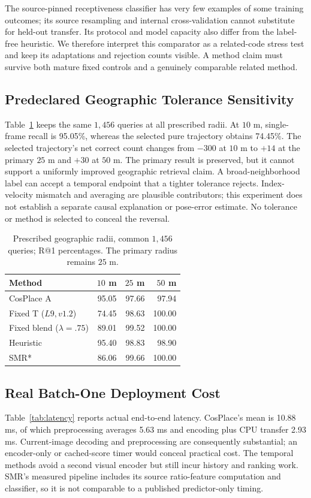 \documentclass[conference]{IEEEtran}
\begin{document}
The source-pinned receptiveness classifier has very few examples of some training outcomes; its source resampling and internal cross-validation cannot substitute for held-out transfer. Its protocol and model capacity also differ from the label-free heuristic. We therefore interpret this comparator as a related-code stress test and keep its adaptations and rejection counts visible. A method claim must survive both mature fixed controls and a genuinely comparable related method.

\subsection{Predeclared Geographic Tolerance Sensitivity}
Table~\ref{tab:radius} keeps the same $1,456$ queries at all prescribed radii. At $10$ m, single-frame recall is 95.05\%, whereas the selected pure trajectory obtains 74.45\%. The selected trajectory's net correct count changes from $-300$ at $10$ m to $+14$ at the primary $25$ m and $+30$ at $50$ m. The primary result is preserved, but it cannot support a uniformly improved geographic retrieval claim. A broad-neighborhood label can accept a temporal endpoint that a tighter tolerance rejects. Index-velocity mismatch and averaging are plausible contributors; this experiment does not establish a separate causal explanation or pose-error estimate. No tolerance or method is selected to conceal the reversal.
\begin{table}[t]\centering\small
\caption{Prescribed geographic radii, common $1,456$ queries; R@1 percentages. The primary radius remains $25$ m.}\label{tab:radius}
\begin{tabular}{lrrr}\toprule Method & $10$ m & $25$ m & $50$ m\\\midrule
CosPlace A & 95.05 & 97.66 & 97.94\\
Fixed T ($L9,v1.2$) & 74.45 & 98.63 & 100.00\\
Fixed blend ($\lambda=.75$) & 89.01 & 99.52 & 100.00\\
Heuristic & 95.40 & 98.83 & 98.90\\
SMR* & 86.06 & 99.66 & 100.00\\
\bottomrule\end{tabular}\end{table}

\subsection{Real Batch-One Deployment Cost}
Table~\ref{tab:latency} reports actual end-to-end latency. CosPlace's mean is 10.88 ms, of which preprocessing averages 5.63 ms and encoding plus CPU transfer 2.93 ms. Current-image decoding and preprocessing are consequently substantial; an encoder-only or cached-score timer would conceal practical cost. The temporal methods avoid a second visual encoder but still incur history and ranking work. SMR's measured pipeline includes its source ratio-feature computation and classifier, so it is not comparable to a published predictor-only timing.
\end{document}
